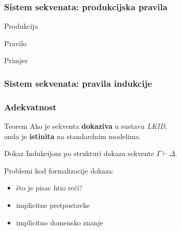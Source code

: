 \documentclass{beamer}
\begin{document}
\begin{frame}
  \frametitle{Sistem sekvenata: produkcijska pravila}
  \begin{block}{Produkcija}
    \begin{prooftree}
    \end{prooftree}
  \end{block}

  \begin{block}{Pravilo}
    \begin{footnotesize}
      \begin{prooftree}
      \end{prooftree}
    \end{footnotesize}
  \end{block}

  \begin{block}{Primjer}
    \begin{prooftree}
  \end{prooftree}
  \end{block}
\end{frame}

\begin{frame}
  \frametitle{Sistem sekvenata: pravila indukcije}
  
\end{frame}

\begin{frame}
  \frametitle{Adekvatnost}
  \begin{block}{Teorem}
    Ako je sekventa \textbf{dokaziva} u sustavu \textit{LKID}, \\onda je \textbf{istinita} na standardnim modelima.
  \end{block}
  \begin{alertblock}{Dokaz}
    Indukcijom po strukturi dokaza sekvente \(\Gamma \vdash \Delta\).
  \end{alertblock}
  Problemi kod formalizacije dokaza:
  \begin{itemize}
  \item što je pisac htio reći?
  \item implicitne pretpostavke
  \item implicitno domensko znanje
  \end{itemize}
\end{frame}
\end{document}
